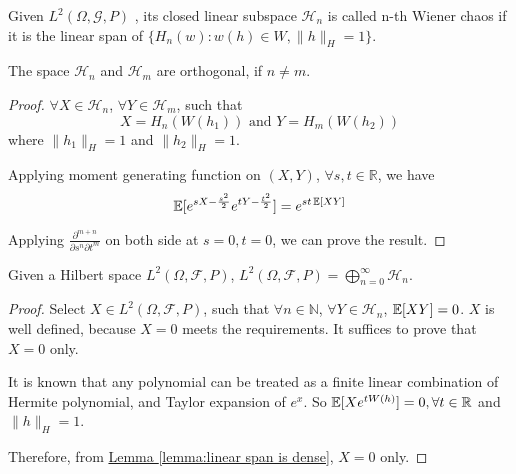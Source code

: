 \begin{definition}
Given $L^2(\Omega, \mathcal{G}, P)$
, its closed linear subspace $\mathcal{H}_n$ is called n-th Wiener chaos
if it is the linear span of 
$\{H_n(w): w(h) \in W, \lVert h \rVert_{H} = 1\}$. 
\end{definition}

\begin{lemma}
The space $\mathcal{H}_n$ and $\mathcal{H}_m$ are orthogonal, if $n \neq m$. 
\end{lemma}

\begin{proof}
$\forall X \in \mathcal{H}_n$, 
$\forall Y \in \mathcal{H}_m$, 
such that 
\[X = H_n(W(h_1)) \text{ and } Y = H_m(W(h_2))\]
where $\lVert h_1 \rVert_{H} = 1$ 
and $\lVert h_2 \rVert_{H} = 1$. 

Applying moment generating function on $(X, Y)$, 
$\forall s, t \in \mathbb{R}$, 
we have 
\[\operatorname{\mathbb{E}}[e^{sX - \frac{s^2}{2}}e^{tY - \frac{t^2}{2}}] 
= e^{st\operatorname{\mathbb{E}}[XY]}\]

Applying $\frac{\partial^{m+n}}{\partial s^{n} \partial t^{m}}$ on both side at 
$s=0, t=0$, we can prove the result. 
\end{proof}

\begin{theorem}
Given a Hilbert space $L^2(\Omega, \mathcal{F}, P)$, $L^2(\Omega, \mathcal{F}, P) = \bigoplus_{n=0}^{\infty} \mathcal{H}_n$.  
\end{theorem}

\begin{proof}
Select $X \in L^2(\Omega, \mathcal{F}, P)$, 
such that $\forall n \in \mathbb{N}$, $\forall Y \in \mathcal{H}_n$, 
$\operatorname{\mathbb{E}}[XY] = 0$. $X$ is well defined, because $X=0$ meets the requirements. It suffices to prove that $X = 0$ only. 

It is known that any polynomial can be treated as a finite linear combination of Hermite polynomial, 
and Taylor expansion of $e^x$. So $\operatorname{\mathbb{E}}[X e^{t W(h)}] = 0, \forall t \in \mathbb{R}$ and $\lVert h \rVert_{H} = 1$. 

Therefore, from \hyperref[lemma:linear span is dense]
{Lemma \ref*{lemma:linear span is dense}}, $X = 0$ only. 
\end{proof}

%
%    
